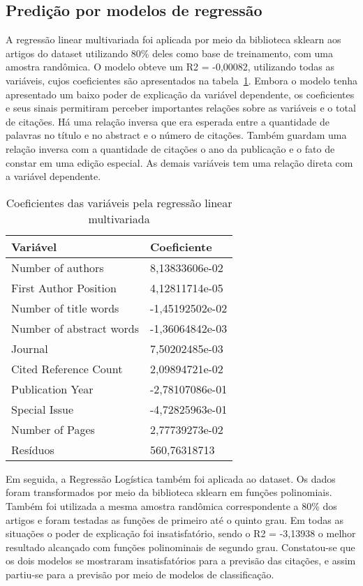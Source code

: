 \documentclass[runningheads]{llncs}
\begin{document}
\subsection{Predição por modelos de regressão}

A regressão linear multivariada foi aplicada por meio da biblioteca sklearn aos artigos do dataset utilizando 80\% deles como base de treinamento, com uma amostra randômica. O modelo obteve um R2 = -0,00082, utilizando todas as variáveis, cujos coeficientes são apresentados na tabela~\ref{tabrlm}. Embora o modelo tenha apresentado um baixo poder de explicação da variável dependente, os coeficientes e seus sinais permitiram perceber importantes relações sobre as variáveis e o total de citações. Há uma relação inversa que era esperada entre a quantidade de palavras no título e no abstract e o número de citações. Também guardam uma relação inversa com a quantidade de citações o ano da publicação e o fato de constar em uma edição especial. As demais variáveis tem uma relação direta com a variável dependente.

\begin{table}[]
    \centering
    \caption{Coeficientes das variáveis pela regressão linear multivariada}
    \label{tabrlm}
    \begin{tabular}{|l|l|}
         \hline
         Variável & Coeficiente\\
         \hline
         Number of authors & 8,13833606e-02\\
         First Author Position & 4,12811714e-05\\
         Number of title words & -1,45192502e-02\\
         Number of abstract words & -1,36064842e-03\\
         Journal & 7,50202485e-03\\
         Cited Reference Count & 2,09894721e-02\\
         Publication Year & -2,78107086e-01\\
         Special Issue & -4,72825963e-01\\
         Number of Pages & 2,77739273e-02\\
         Resíduos & 560,76318713\\
         \hline
    \end{tabular}
\end{table}

Em seguida, a Regressão Logística também foi aplicada ao dataset. Os dados foram transformados por meio da biblioteca sklearn em funções polinomiais. Também foi utilizada a mesma amostra randômica correspondente a 80\% dos artigos e foram testadas as funções de primeiro até o quinto grau. Em todas as situações o poder de explicação foi insatisfatório, sendo o R2 = -3,13938 o melhor resultado alcançado com funções polinominais de segundo grau. Constatou-se que os dois modelos se mostraram insatisfatórios para a previsão das citações, e assim partiu-se para a previsão por meio de modelos de classificação.
\end{document}
